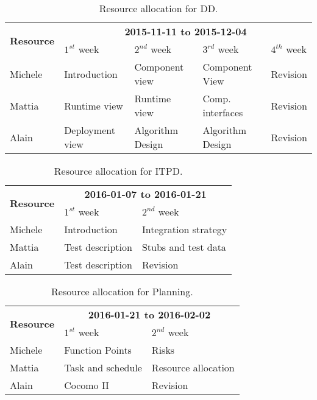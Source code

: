 \begin{table}[htb]
    \centering
    \begin{small}
    \begin{tabular}{| l | l | l | l | l |}
        \hline
        \multirow{2}{*}{\textbf{Resource}} & \multicolumn{4}{c|}{\textbf{2015-11-11 to 2015-12-04}} \\
        \cline{2-5}
        & $1^{st}$ week & $2^{nd}$ week & $3^{rd} $ week & $4^{th}$ week\\
        \hline
        Michele        & Introduction      & Component view     & Component View & Revision   \\
        Mattia         & Runtime view      & Runtime view       & Comp. interfaces & Revision   \\
        Alain          & Deployment view   & Algorithm Design   & Algorithm Design & Revision  \\
        \hline
    \end{tabular}
    \end{small}
    \caption{Resource allocation for DD.}
    \label{tab:dd-res-alloc}
\end{table}

\begin{table}
    \centering
    \begin{tabular}{| l | l | l |}
        \hline
        \multirow{2}{*}{\textbf{Resource}} & \multicolumn{2}{c|}{\textbf{2016-01-07 to 2016-01-21}} \\
        \cline{2-3}
        & $1^{st}$ week & $2^{nd}$ week \\
        \hline
        Michele        & Introduction        & Integration strategy       \\
        Mattia         & Test description    & Stubs and test data    \\
        Alain          & Test description    & Revision    \\
        \hline
    \end{tabular}
    \caption{Resource allocation for ITPD.}
    \label{tab:itpd-res-alloc}
\end{table}

\begin{table}
    \centering
    \begin{tabular}{| l | l | l |}
        \hline
        \multirow{2}{*}{\textbf{Resource}} & \multicolumn{2}{c|}{\textbf{2016-01-21 to 2016-02-02}} \\
        \cline{2-3}
        & $1^{st}$ week & $2^{nd}$ week \\
        \hline
        Michele        & Function Points       & Risks      \\
        Mattia         & Task and schedule     & Resource allocation    \\
        Alain          & Cocomo II             & Revision    \\
        \hline
    \end{tabular}
    \caption{Resource allocation for Planning.}
    \label{tab:plan-res-alloc}
\end{table}

